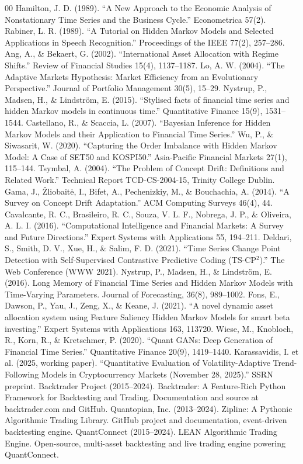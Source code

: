 \documentclass[conference]{IEEEtran}
\begin{document}
\begin{thebibliography}{00}
 Hamilton, J. D. (1989). ``A New Approach to the Economic Analysis of Nonstationary Time Series and the Business Cycle.'' Econometrica 57(2).
 Rabiner, L. R. (1989). ``A Tutorial on Hidden Markov Models and Selected Applications in Speech Recognition.'' Proceedings of the IEEE 77(2), 257--286.
 Ang, A., \& Bekaert, G. (2002). ``International Asset Allocation with Regime Shifts.'' Review of Financial Studies 15(4), 1137--1187.
 Lo, A. W. (2004). ``The Adaptive Markets Hypothesis: Market Efficiency from an Evolutionary Perspective.'' Journal of Portfolio Management 30(5), 15--29.
 Nystrup, P., Madsen, H., \& Lindstr\"{o}m, E. (2015). ``Stylised facts of financial time series and hidden Markov models in continuous time.'' Quantitative Finance 15(9), 1531--1544.
 Castellano, R., \& Scaccia, L. (2007). ``Bayesian Inference for Hidden Markov Models and their Application to Financial Time Series.''
 Wu, P., \& Siwasarit, W. (2020). ``Capturing the Order Imbalance with Hidden Markov Model: A Case of SET50 and KOSPI50.'' Asia-Pacific Financial Markets 27(1), 115--144.
 Tsymbal, A. (2004). ``The Problem of Concept Drift: Definitions and Related Work.'' Technical Report TCD-CS-2004-15, Trinity College Dublin.
 Gama, J., \v{Z}liobait\.{e}, I., Bifet, A., Pechenizkiy, M., \& Bouchachia, A. (2014). ``A Survey on Concept Drift Adaptation.'' ACM Computing Surveys 46(4), 44.
 Cavalcante, R. C., Brasileiro, R. C., Souza, V. L. F., Nobrega, J. P., \& Oliveira, A. L. I. (2016). ``Computational Intelligence and Financial Markets: A Survey and Future Directions.'' Expert Systems with Applications 55, 194--211.
 Deldari, S., Smith, D. V., Xue, H., \& Salim, F. D. (2021). ``Time Series Change Point Detection with Self-Supervised Contrastive Predictive Coding (TS-CP$^2$).'' The Web Conference (WWW 2021).
 Nystrup, P., Madsen, H., \& Lindstr\"{o}m, E. (2016). Long Memory of Financial Time Series and Hidden Markov Models with Time-Varying Parameters. Journal of Forecasting, 36(8), 989--1002.
 Fons, E., Dawson, P., Yau, J., Zeng, X., \& Keane, J. (2021). ``A novel dynamic asset allocation system using Feature Saliency Hidden Markov Models for smart beta investing.'' Expert Systems with Applications 163, 113720.
 Wiese, M., Knobloch, R., Korn, R., \& Kretschmer, P. (2020). ``Quant GANs: Deep Generation of Financial Time Series.'' Quantitative Finance 20(9), 1419--1440.
 Karassavidis, I. et al. (2025, working paper). ``Quantitative Evaluation of Volatility-Adaptive Trend-Following Models in Cryptocurrency Markets (November 28, 2025).'' SSRN preprint.
 Backtrader Project (2015--2024). Backtrader: A Feature-Rich Python Framework for Backtesting and Trading. Documentation and source at backtrader.com and GitHub.
 Quantopian, Inc. (2013--2024). Zipline: A Pythonic Algorithmic Trading Library. GitHub project and documentation, event-driven backtesting engine.
 QuantConnect (2015--2024). LEAN Algorithmic Trading Engine. Open-source, multi-asset backtesting and live trading engine powering QuantConnect.

\end{thebibliography}
\end{document}
